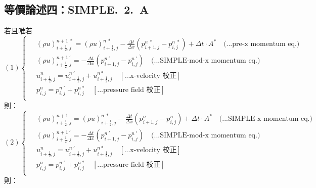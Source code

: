 \documentclass[12pt]{article}
\begin{document}
\subsection{等價論述四：SIMPLE.\ 2.\ A}
\label{2.A.e}
\noindent 若且唯若\\
\begin{equation}
(1)
\left\{
\begin{aligned}
    \ &(\rho u)_{i+\frac{1}{2},j}^{n+1\ *} = (\rho u)_{i+\frac{1}{2},j}^{n\ *} - \frac{\Delta t}{\Delta x}(p_{i+1,j}^{n\ *} - p_{i,j}^{n\ *}) + \Delta t \cdot A^{*}  \quad \text{(...pre-x momentum eq.)}\\[1.5ex]
    \ &(\rho u)_{i+\frac{1}{2},j}^{n+1\ \prime} = - \frac{\Delta t}{\Delta x}(p_{i+1,j}^{n\ \prime} - p_{i,j}^{n\ \prime})  \quad \text{(...SIMPLE-mod-x momentum eq.)}\\[1.5ex]
    \ &u_{i+\frac{1}{2},j}^{n} = u_{i+\frac{1}{2},j}^{n\ '} + u_{i+\frac{1}{2},j}^{n *}  \quad \left[\text{...x-velocity 校正}\right]\\[1.5ex]
    \ &p_{i,j}^{n} = p_{i,j}^{n\ '} + p_{i,j}^{n *} \quad\left[\text{...pressure field 校正}\right]\\[1.5ex]
\end{aligned}
\right.
\end{equation}
\noindent 則：\\
\begin{equation}
(2)
\left\{
\begin{aligned}
    \ &(\rho u)_{i+\frac{1}{2},j}^{n+1} = (\rho u)_{i+\frac{1}{2},j}^{n\ *} - \frac{\Delta t}{\Delta x}(p_{i+1,j}^{n} - p_{i,j}^{n}) + \Delta t \cdot A^{*}  \quad \text{(...SIMPLE-x momentum eq.)}\\[1.5ex]
    \ &(\rho u)_{i+\frac{1}{2},j}^{n+1\ \prime} = - \frac{\Delta t}{\Delta x}(p_{i+1,j}^{n\ \prime} - p_{i,j}^{n\ \prime})  \quad \text{(...SIMPLE-mod-x momentum eq.)}\\[1.5ex]
    \ &u_{i+\frac{1}{2},j}^{n} = u_{i+\frac{1}{2},j}^{n\ '} + u_{i+\frac{1}{2},j}^{n *}  \quad \left[\text{...x-velocity 校正}\right]\\[1.5ex]
    \ &p_{i,j}^{n} = p_{i,j}^{n\ '} + p_{i,j}^{n *} \quad\left[\text{...pressure field 校正}\right]\\[1.5ex]
\end{aligned}
\right.
\end{equation}
\noindent 則：\\
\end{document}
